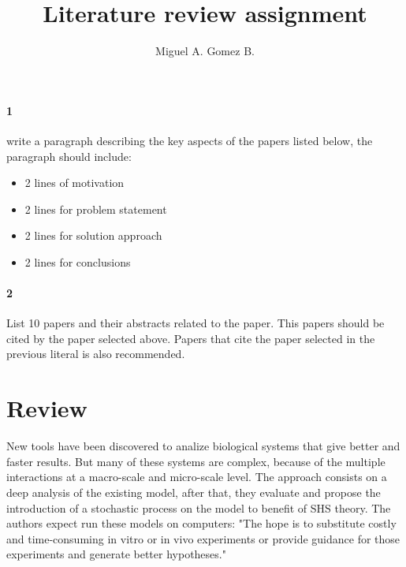 \documentclass{article}
\title{Literature review assignment}
\author{Miguel A. Gomez B.}
\begin{document}
	
\maketitle
\paragraph{1} write a paragraph describing the key aspects of the papers listed below, the
paragraph should include:
\begin{itemize}
	\item 2 lines of motivation
	\item 2 lines for problem statement
	\item 2 lines for solution approach
	\item 2 lines for conclusions
\end{itemize}
\paragraph{2} List 10 papers and their abstracts related to the paper. This papers should be cited by the
paper selected above. Papers that cite the paper selected in the previous literal is also
recommended.

\newpage

\section{Review}

New tools have been discovered to analize biological systems that give better and faster results. But many of these systems are complex, because of the multiple interactions at a macro-scale and micro-scale level. The approach consists on a deep analysis of the existing model, after that, they evaluate and propose the introduction of a stochastic process on the model to benefit of SHS theory. The authors expect run these models on computers: "The hope is to substitute costly and time-consuming in vitro or in vivo experiments or provide guidance for those experiments and generate better hypotheses."\cite{xiangfang_li_review_2017:1}


\newpage



\end{document}
